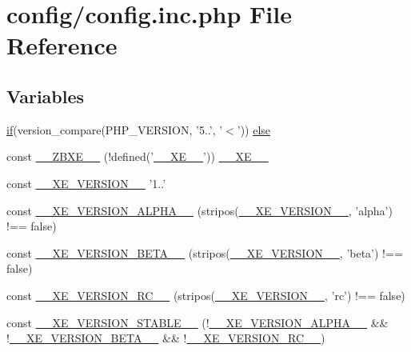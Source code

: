 \hypertarget{config_8inc_8php}{\section{config/config.inc.\+php File Reference}
\label{config_8inc_8php}
}
\subsection*{Variables}
\begin{DoxyCompactItemize}
\item 
\hyperlink{point__level__icon_8addon_8php_a29031816e50a8f742422e671b2bef9b2}{if}(version\+\_\+compare(P\+H\+P\+\_\+\+V\+E\+R\+S\+I\+O\+N, '5..', '$<$')) \hyperlink{config_8inc_8php_a249caa62ba3f93fa3cb8d963d5634fe1}{else}
\item 
const \hyperlink{config_8inc_8php_a5dee6469b95523a5bafe17e6b29c6bf7}{\+\_\+\+\_\+\+Z\+B\+X\+E\+\_\+\+\_\+} (!defined('\hyperlink{index_8php_a697de427d83b791899ae45d555377756}{\+\_\+\+\_\+\+X\+E\+\_\+\+\_\+}')) \hyperlink{index_8php_a697de427d83b791899ae45d555377756}{\+\_\+\+\_\+\+X\+E\+\_\+\+\_\+}
\item 
const \hyperlink{config_8inc_8php_afceaaec30d0e5b6a78d0ae28bcbfc8f3}{\+\_\+\+\_\+\+X\+E\+\_\+\+V\+E\+R\+S\+I\+O\+N\+\_\+\+\_\+} '1..'
\item 
const \hyperlink{config_8inc_8php_aaee982ed748e379cde978edfe8d433e1}{\+\_\+\+\_\+\+X\+E\+\_\+\+V\+E\+R\+S\+I\+O\+N\+\_\+\+A\+L\+P\+H\+A\+\_\+\+\_\+} (stripos(\hyperlink{config_8inc_8php_afceaaec30d0e5b6a78d0ae28bcbfc8f3}{\+\_\+\+\_\+\+X\+E\+\_\+\+V\+E\+R\+S\+I\+O\+N\+\_\+\+\_\+}, 'alpha') !== false)
\item 
const \hyperlink{config_8inc_8php_aac8a83557f3eab1d2d2583fe21559ca9}{\+\_\+\+\_\+\+X\+E\+\_\+\+V\+E\+R\+S\+I\+O\+N\+\_\+\+B\+E\+T\+A\+\_\+\+\_\+} (stripos(\hyperlink{config_8inc_8php_afceaaec30d0e5b6a78d0ae28bcbfc8f3}{\+\_\+\+\_\+\+X\+E\+\_\+\+V\+E\+R\+S\+I\+O\+N\+\_\+\+\_\+}, 'beta') !== false)
\item 
const \hyperlink{config_8inc_8php_a1d41a8e68af4b70491bdb523ccb57ac2}{\+\_\+\+\_\+\+X\+E\+\_\+\+V\+E\+R\+S\+I\+O\+N\+\_\+\+R\+C\+\_\+\+\_\+} (stripos(\hyperlink{config_8inc_8php_afceaaec30d0e5b6a78d0ae28bcbfc8f3}{\+\_\+\+\_\+\+X\+E\+\_\+\+V\+E\+R\+S\+I\+O\+N\+\_\+\+\_\+}, 'rc') !== false)
\item 
const \hyperlink{config_8inc_8php_ae578aaae34567264807d3f832230c1ed}{\+\_\+\+\_\+\+X\+E\+\_\+\+V\+E\+R\+S\+I\+O\+N\+\_\+\+S\+T\+A\+B\+L\+E\+\_\+\+\_\+} (!\hyperlink{config_8inc_8php_aaee982ed748e379cde978edfe8d433e1}{\+\_\+\+\_\+\+X\+E\+\_\+\+V\+E\+R\+S\+I\+O\+N\+\_\+\+A\+L\+P\+H\+A\+\_\+\+\_\+} \&\& !\hyperlink{config_8inc_8php_aac8a83557f3eab1d2d2583fe21559ca9}{\+\_\+\+\_\+\+X\+E\+\_\+\+V\+E\+R\+S\+I\+O\+N\+\_\+\+B\+E\+T\+A\+\_\+\+\_\+} \&\& !\hyperlink{config_8inc_8php_a1d41a8e68af4b70491bdb523ccb57ac2}{\+\_\+\+\_\+\+X\+E\+\_\+\+V\+E\+R\+S\+I\+O\+N\+\_\+\+R\+C\+\_\+\+\_\+})

\end{DoxyCompactItemize}
